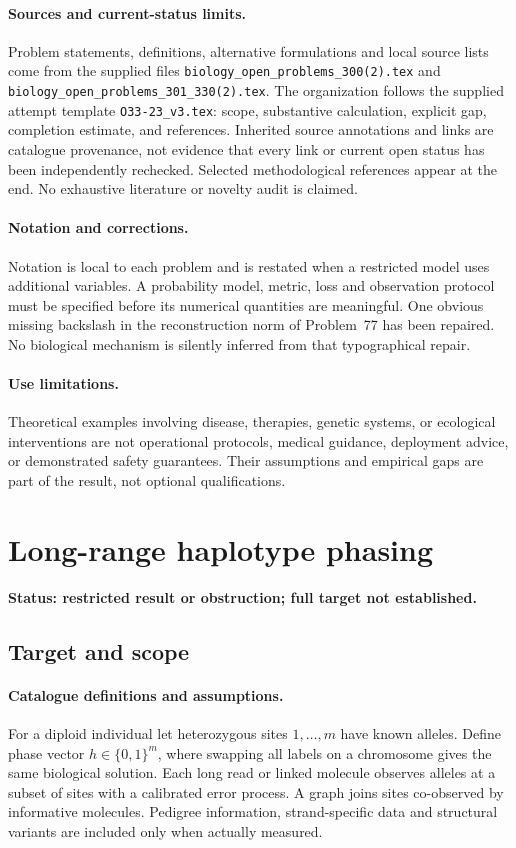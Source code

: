 \documentclass[11pt]{article}
\begin{document}
\paragraph{Sources and current-status limits.}
Problem statements, definitions, alternative formulations and local source lists
come from the supplied files
\texttt{biology\_open\_problems\_300(2).tex} and
\texttt{biology\_open\_problems\_301\_330(2).tex}.
The organization follows the supplied attempt template
\texttt{O33-23\_v3.tex}: scope, substantive calculation, explicit gap,
completion estimate, and references. Inherited source annotations and links are
catalogue provenance, not evidence that every link or current open status has
been independently rechecked. Selected methodological references appear at the
end. No exhaustive literature or novelty audit is claimed.

\paragraph{Notation and corrections.}
Notation is local to each problem and is restated when a restricted model uses
additional variables. A probability model, metric, loss and observation protocol
must be specified before its numerical quantities are meaningful. One obvious
missing backslash in the reconstruction norm of Problem~77 has been repaired.
No biological mechanism is silently inferred from that typographical repair.

\paragraph{Use limitations.}
Theoretical examples involving disease, therapies, genetic systems, or ecological
interventions are not operational protocols, medical guidance, deployment advice,
or demonstrated safety guarantees. Their assumptions and empirical gaps are part
of the result, not optional qualifications.


\section*{Long-range haplotype phasing}
\label{prob:065}
\noindent\textbf{Status: restricted result or obstruction; full target not established.}
\subsection{Target and scope}
\paragraph{Catalogue definitions and assumptions.}
For a diploid individual let heterozygous sites $1,\ldots,m$ have known alleles. Define phase vector $h\in\{0,1\}^m$, where swapping all labels on a chromosome gives the same biological solution. Each long read or linked molecule observes alleles at a subset of sites with a calibrated error process. A graph joins sites co-observed by informative molecules. Pedigree information, strand-specific data and structural variants are included only when actually measured.
\end{document}
